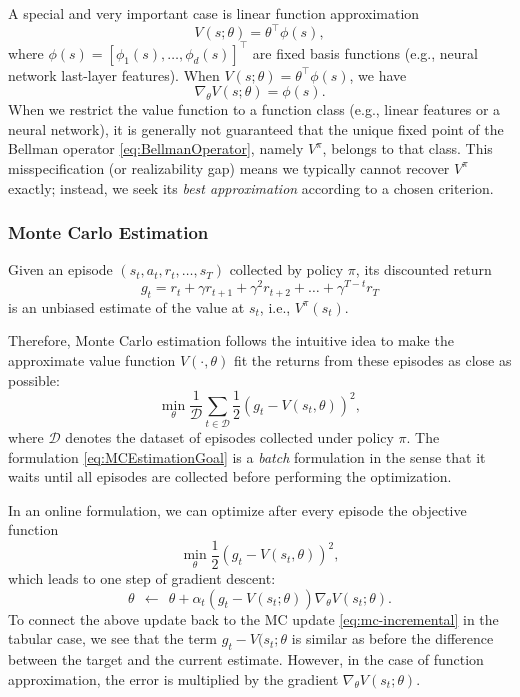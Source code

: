\documentclass[
]{book}
\theoremstyle{definition}
\theoremstyle{definition}
\theoremstyle{definition}
\theoremstyle{definition}
\theoremstyle{remark}
\begin{document}
A special and very important case is linear function approximation
\begin{equation}
V(s;\theta) = \theta^\top \phi(s),
\label{eq:LinearV}
\end{equation}
where \(\phi(s) = [\phi_1(s),\ldots,\phi_d(s)]^\top\) are fixed basis functions (e.g., neural network last-layer features). When \(V(s;\theta) = \theta^{\top} \phi(s)\), we have
\[
\nabla_\theta V(s;\theta) = \phi(s).
\]
When we restrict the value function to a function class (e.g., linear features or a neural network), it is generally not guaranteed that the unique fixed point of the Bellman operator \eqref{eq:BellmanOperator}, namely \(V^\pi\), belongs to that class. This misspecification (or realizability gap) means we typically cannot recover \(V^\pi\) exactly; instead, we seek its \emph{best approximation} according to a chosen criterion.

\subsubsection{Monte Carlo Estimation}\label{monte-carlo-estimation-1}

Given an episode \((s_t,a_t,r_t,\dots,s_T)\) collected by policy \(\pi\), its discounted return
\[
g_t = r_t + \gamma r_{t+1} + \gamma^2 r_{t+2} + \dots + \gamma^{T-t} r_T
\]
is an unbiased estimate of the value at \(s_t\), i.e., \(V^{\pi}(s_t)\).

Therefore, Monte Carlo estimation follows the intuitive idea to make the approximate value function \(V(\cdot, \theta)\) fit the returns from these episodes as close as possible:
\begin{equation}
\min_{\theta} \frac{1}{\mathcal{D}} \sum_{t \in \mathcal{D}} \frac{1}{2} (g_t - V(s_t, \theta))^2,
\label{eq:MCEstimationGoal}
\end{equation}
where \(\mathcal{D}\) denotes the dataset of episodes collected under policy \(\pi\). The formulation \eqref{eq:MCEstimationGoal} is a \emph{batch} formulation in the sense that it waits until all episodes are collected before performing the optimization.

In an online formulation, we can optimize after every episode the objective function
\[
\min_{\theta} \frac{1}{2} (g_t - V(s_t, \theta))^2,
\]
which leads to one step of gradient descent:
\begin{equation}
\theta \ \ \leftarrow \ \ \theta + \alpha_t (g_t - V(s_t;\theta)) \nabla_\theta V(s_t; \theta).
\label{eq:MCOneStepGD}
\end{equation}
To connect the above update back to the MC update \eqref{eq:mc-incremental} in the tabular case, we see that the term \(g_t - V(s_t;\theta\) is similar as before the difference between the target and the current estimate. However, in the case of function approximation, the error is multiplied by the gradient \(\nabla_\theta V (s_t; \theta)\).
\end{document}

